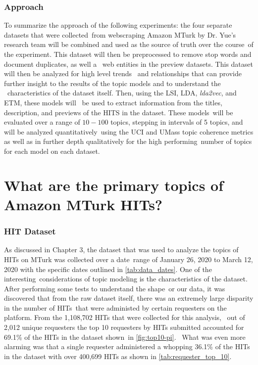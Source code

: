\documentclass[letterpaper,12pt]{article}
\begin{document}
\subsection{Approach}
To summarize the approach of the following experiments: the four separate datasets that were collected\
from webscraping Amazon MTurk by Dr. Yue's research team will be combined and used as the source of truth over the course\
of the experiment. This dataset will then be preprocessed to remove stop words and document duplicates, as well a \
web entities in the preview datasets. This dataset will then be analyzed for high level trends \
and relationships that can provide further insight to the results of the topic models and to understand the \
characteristics of the dataset itself. Then, using the LSI, LDA, \emph{lda2vec}, and ETM, these models will \
be used to extract information from the titles, description, and previews of the HITS in the dataset. These models\
will be evaluated over a range of $10-100$ topics, stepping in intervals of 5 topics, and will be analyzed quantitatively\
using the UCI and UMass topic coherence metrics as well as in further depth qualitatively for the high performing\
number of topics for each model on each dataset. 

\chapter{What are the primary topics of Amazon MTurk HITs?}

\subsection{HIT Dataset}
As discussed in Chapter 3, the dataset that was used to analyze the topics of HITs on MTurk was collected over a date\
range of January 26, 2020 to March 12, 2020 with the specific dates outlined in \ref{tab:data_dates}. One of the interesting\
considerations of topic modeling is the characteristics of the dataset. After performing some tests to understand the shape\
or our data, it was discovered that from the raw dataset itself, there was an extremely large disparity in the number of HITs\
that were administed by certain requesters on the platform. From the 1,108,702 HITs that were collected for this analysis, \
out of 2,012 unique requesters the top 10 requesters by HITs submitted accounted for 69.1\% of the HITs in the dataset shown\
in \ref{fig:top10-pi}. \
What was even more alarming was that a single requester administered a whopping 36.1\% of the HITs in the dataset with 
over 400,699 HITs as shown in \ref{tab:requester_top_10}. \
\end{document}
